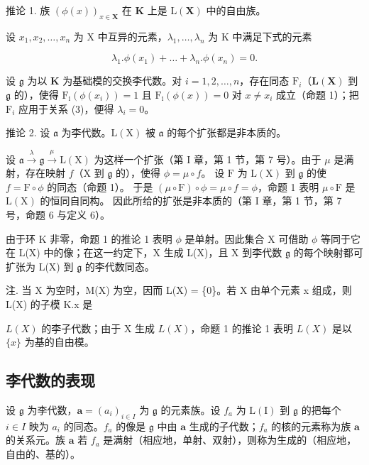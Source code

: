 推论 1. 族 \((\phi (x))_{x\in \mathbf{X}}\) 在 \(\mathbf{K}\) 上是 \(\mathrm{L}(\mathbf{X})\) 中的自由族。

设 \(x_{1}, x_{2}, \ldots, x_{n}\) 为 X 中互异的元素，\(\lambda_{1}, \ldots, \lambda_{n}\) 为 K 中满足下式的元素

\[
\lambda_ {1}. \phi (x _ {1}) + \dots + \lambda_ {n}. \phi (x _ {n}) = 0.\tag{3}
\]

设 \(\mathfrak{g}\) 为以 \(\mathbf{K}\) 为基础模的交换李代数。对 \(i = 1,2,\ldots ,n\)，存在同态 \(\mathrm{F}_i\)（\(\mathbf{L}(\mathbf{X})\) 到 \(\mathfrak{g}\) 的），使得 \(\mathrm{F_i}(\phi (x_i)) = 1\) 且 \(\mathrm{F_i}(\phi (x)) = 0\) 对 \(x\neq x_{i}\) 成立（命题 1）；把 \(\mathrm{F}_i\) 应用于关系 (3)，便得 \(\lambda_{i} = 0\)。

推论 2. 设 \(\mathfrak{a}\) 为李代数。\(\mathrm{L}(\mathrm{X})\) 被 \(\mathfrak{a}\) 的每个扩张都是非本质的。

设 \(\mathfrak{a} \xrightarrow{\lambda} \mathfrak{g} \xrightarrow{\mu} \mathrm{L}(\mathrm{X})\) 为这样一个扩张（第 I 章，第 1 节，第 7 号）。由于 \(\mu\) 是满射，存在映射 \(f\)（\(\mathrm{X}\) 到 \(\mathfrak{g}\) 的），使得 \(\phi = \mu \circ f\)。 设 \(\mathrm{F}\) 为 \(\mathrm{L}(\mathrm{X})\) 到 \(\mathfrak{g}\) 的使 \(f = \mathrm{F} \circ \phi\) 的同态（命题 1）。 于是 \((\mu \circ \mathrm{F}) \circ \phi = \mu \circ f = \phi\)，命题 1 表明 \(\mu \circ \mathrm{F}\) 是 \(\mathrm{L}(\mathrm{X})\) 的恒同自同构。 因此所给的扩张是非本质的（第 I 章，第 1 节，第 7 号，命题 6 与定义 6）。

由于环 K 非零，命题 1 的推论 1 表明 \(\phi\) 是单射。因此集合 X 可借助 \(\phi\) 等同于它在 L(X) 中的像；在这一约定下，X 生成 L(X)，且 X 到李代数 \(\mathfrak{g}\) 的每个映射都可扩张为 L(X) 到 \(\mathfrak{g}\) 的李代数同态。

注. 当 X 为空时，M(X) 为空，因而 L(X) = \{0\}。若 X 由单个元素 x 组成，则 L(X) 的子模 K.x 是

\(L(X)\) 的李子代数；由于 X 生成 \(L(X)\)，命题 1 的推论 1 表明 \(L(X)\) 是以 \(\{x\}\) 为基的自由模。

\subsection{李代数的表现}

设 \(\mathfrak{g}\) 为李代数，\(\pmb{a} = (a_i)_{i\in I}\) 为 \(\mathfrak{g}\) 的元素族。设 \(f_{a}\) 为 \(\mathrm{L(I)}\) 到 \(\mathfrak{g}\) 的把每个 \(i\in I\) 映为 \(a_{i}\) 的同态。\(f_{a}\) 的像是 \(\mathfrak{g}\) 中由 \(\pmb{a}\) 生成的子代数；\(f_{a}\) 的核的元素称为族 \(\pmb{a}\) 的关系元。族 \(\pmb{a}\) 若 \(f_{a}\) 是满射（相应地，单射、双射），则称为生成的（相应地，自由的、基的）。

